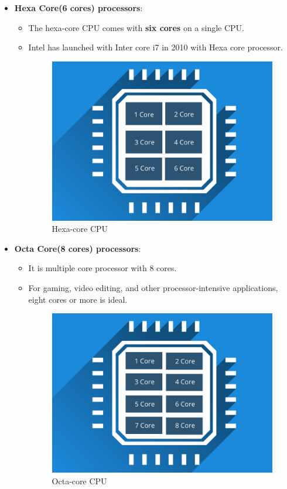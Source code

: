 \begin{flushleft}
\begin{itemize}
	\bigskip
	
	\item \textbf{Hexa Core(6 cores) processors}:
	\begin{itemize}
		\item The hexa-core CPU comes with \textbf{six cores} on a single CPU. 
		\item Intel has launched with Inter core i7 in 2010 with Hexa core processor.
		\begin{figure}[h!]
			\centering
			\includegraphics[scale=.3]{content/chapter12/images/hexa.png}
			\caption{Hexa-core CPU}
			\label{fig:single-core4}
		\end{figure}
	\end{itemize}			
	\newpage
	\item \textbf{Octa Core(8 cores) processors}:
	\begin{itemize}
		\item It is multiple core processor with 8 cores.
		\item For gaming, video editing, and other processor-intensive applications, eight cores or more is ideal.
		\begin{figure}[h!]
			\centering
			\includegraphics[scale=.3]{content/chapter12/images/octa.png}
			\caption{Octa-core CPU}
			\label{fig:single-core4}
		\end{figure}
	\end{itemize}		
	

\end{itemize}
\end{flushleft}
